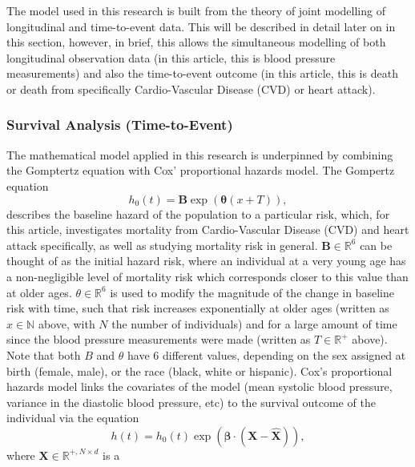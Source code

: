 \documentclass[
]{article}
\begin{document}
The model used in this research is built from the theory of joint
modelling of longitudinal and time-to-event data. This will be described
in detail later on in this section, however, in brief, this allows the
simultaneous modelling of both longitudinal observation data (in this
article, this is blood pressure measurements) and also the time-to-event
outcome (in this article, this is death or death from specifically
Cardio-Vascular Disease (CVD) or heart attack).

\hypertarget{survival-analysis-time-to-event}{%
\subsubsection{Survival Analysis
(Time-to-Event)}\label{survival-analysis-time-to-event}}

The mathematical model applied in this research is underpinned by
combining the Gomptertz equation with Cox' proportional hazards model.
The Gompertz equation \begin{equation}\label{gompertz}
h_0(t)=\boldsymbol{B}\exp{\left(\boldsymbol{\theta}(x+T)\right)},
\end{equation} describes the baseline hazard of the population to a
particular risk, which, for this article, investigates mortality from
Cardio-Vascular Disease (CVD) and heart attack specifically, as well as
studying mortality risk in general. \(\boldsymbol{B}\in\mathbb{R}^{6}\)
can be thought of as the initial hazard risk, where an individual at a
very young age has a non-negligible level of mortality risk which
corresponds closer to this value than at older ages.
\(\theta\in\mathbb{R}^{6}\) is used to modify the magnitude of the
change in baseline risk with time, such that risk increases
exponentially at older ages (written as \(x\in\mathbb{N}\) above, with
\(N\) the number of individuals) and for a large amount of time since
the blood pressure measurements were made (written as
\(T\in\mathbb{R}^+\) above). Note that both \(B\) and \(\theta\) have 6
different values, depending on the sex assigned at birth (female, male),
or the race (black, white or hispanic). Cox's proportional hazards model
links the covariates of the model (mean systolic blood pressure,
variance in the diastolic blood pressure, etc) to the survival outcome
of the individual via the equation \begin{equation}\label{prophaz}
h(t)=h_0(t)\exp{\left(\boldsymbol{\beta}\cdot(\boldsymbol{X}-\hat{\boldsymbol{X}})\right)},
\end{equation} where \(\boldsymbol{X}\in\mathbb{R}^{+,N\times d}\) is a
\end{document}
